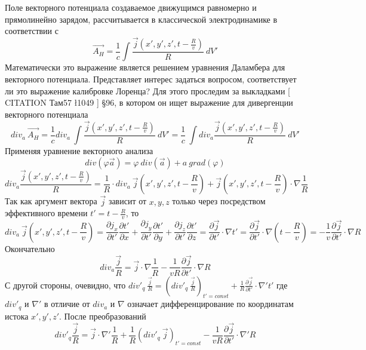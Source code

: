 \documentclass[11pt]{article}
\begin{document}
    Поле векторного потенциала создаваемое движущимся равномерно и
прямолинейно зарядом, рассчитывается в классической электродинамике в
соответствии с
\[\overrightarrow{{{A}_{H}}}=\frac{1}{c}\int{\frac{\overrightarrow{j}\left( x',y',z',t-\frac{R}{v} \right)}{R}}\ dV'\]
Математически это выражение является решением уравнения Даламбера для
векторного потенциала. Представляет интерес задаться вопросом,
соответствует ли это выражение калибровке Лоренца? Для этого проследим
за выкладками {[} CITATION Там57 \l 1049 {]} §96, в котором он ищет
выражение для дивергенции векторного потенциала
\[{{div}_{a}}\ \overrightarrow{{{A}_{H}}}=\frac{1}{c}di{{v}_{a}}\ \int{\frac{\overrightarrow{j}\left( x',y',z',t-\frac{R}{v} \right)}{R}}\ dV'=\frac{1}{c}\ \int{di{{v}_{a}}\frac{\overrightarrow{j}\left( x',y',z',t-\frac{R}{v} \right)}{R}}\ dV'\]
Применяя уравнение векторного анализа
\[div\left( \varphi \overrightarrow{a} \right)=\varphi \ div\left( \overrightarrow{a} \right)+a\ grad\left( \varphi  \right)\]
\[{{div}_{a}}\frac{\overrightarrow{j}\left( x',y',z',t-\frac{R}{v} \right)}{R}=\frac{1}{R}\cdot di{{v}_{a}}\ \overrightarrow{j}\left( x',y',z',t-\frac{R}{v} \right)+\overrightarrow{j}\left( x',y',z',t-\frac{R}{v} \right)\cdot \nabla \frac{1}{R}\]
Так как аргумент вектора \(\overrightarrow{j}\) зависит от \(x,y,z\)
только через посредством эффективного времени \(t'=t-\frac{R}{v}\), то
\[{{div}_{a}}\ \overrightarrow{j}\left( x',y',z',t-\frac{R}{v} \right)=\frac{\partial {{j}_{x}}}{\partial t'}\frac{\partial t'}{\partial x}+\frac{\partial {{j}_{y}}}{\partial t'}\frac{\partial t'}{\partial y}+\frac{\partial {{j}_{z}}}{\partial t'}\frac{\partial t'}{\partial z}=\frac{\partial \overrightarrow{j}}{\partial t'}\cdot \nabla t'=\frac{\partial \overrightarrow{j}}{\partial t'}\cdot \nabla \left( t-\frac{R}{v} \right)=-\frac{1}{v}\frac{\partial \overrightarrow{j}}{\partial t'}\cdot \nabla R\]
Окончательно
\[{{div}_{a}}\frac{\overrightarrow{j}}{R}=\overrightarrow{j}\cdot \nabla \frac{1}{R}-\frac{1}{vR}\frac{\partial \overrightarrow{j}}{\partial t'}\cdot \nabla R\]
С другой стороны, очевидно, что
\(div{{'}_{q}}\ \frac{\overrightarrow{j}}{R}={{\left( div{{'}_{q}}\ \frac{\overrightarrow{j}}{R} \right)}_{t'=const}}+\frac{1}{R}\frac{\partial \overrightarrow{j}}{\partial t'}\cdot \nabla 't'\)
где \(div{{'}_{q}}\) и \(\nabla '\) в отличие от \({{div}_{a}}\) и
$\nabla$ означает дифференцирование по координатам истока
\(x',y',z'\). После преобразований
\[div{{'}_{q}}\frac{\overrightarrow{j}}{R}=\overrightarrow{j}\cdot \nabla '\frac{1}{R}+\frac{1}{R}{{\left( div{{'}_{q}}\ \overrightarrow{j} \right)}_{t'=const}}-\frac{1}{vR}\frac{\partial \overrightarrow{j}}{\partial t'}\cdot \nabla 'R\]
\end{document}
